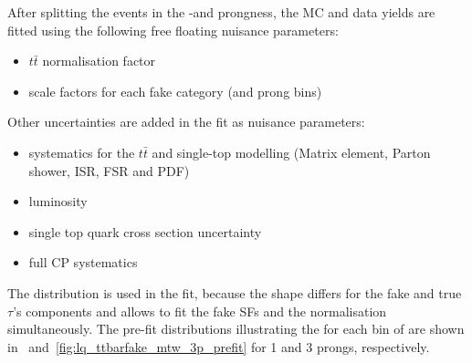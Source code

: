 After splitting the events in the \tauhad-\pT and prongness, the MC and data yields are fitted using the following free floating 
nuisance parameters:
\begin{itemize}
  \item $t\bar{t}$ normalisation factor
  \item scale factors for each fake \tauhad category (\pT and prong bins)
  \end{itemize}
Other uncertainties are added in the fit as nuisance parameters:
\begin{itemize}  
  \item systematics for the $t\bar{t}$ and single-top modelling (Matrix element, Parton shower, ISR, FSR and PDF)
  \item luminosity
  \item single top quark cross section uncertainty
  \item full CP systematics
\end{itemize}

The \mtw distribution is used in the fit, because the \mtw shape differs for the fake and true $\tau$'s components and allows to
fit the fake \tauhad SFs and the \ttbar normalisation simultaneously. The pre-fit distributions illustrating the \mtw for each bin of 
\tauhad \pT are shown in~ and~\ref{fig:lq_ttbarfake_mtw_3p_prefit} for 1 and 3 prongs, 
respectively.

